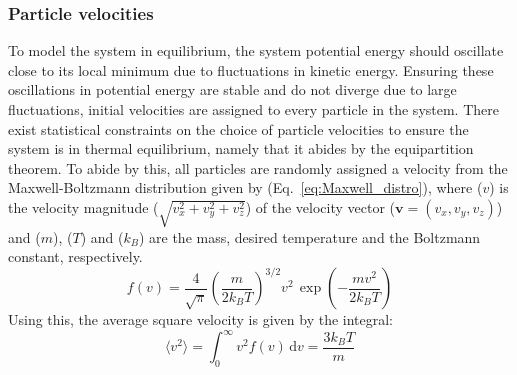 \subsubsection{Particle velocities}
To model the system in equilibrium, the system potential energy should oscillate close to its local minimum due to fluctuations in kinetic energy. Ensuring these oscillations in potential energy are stable and do not diverge due to large fluctuations, initial velocities are assigned to every particle in the system. There exist statistical constraints on the choice of particle velocities to ensure the system is in thermal equilibrium, namely that it abides by the equipartition theorem. To abide by this, all particles are randomly assigned a velocity from the Maxwell-Boltzmann distribution given by (Eq.~\ref{eq:Maxwell_distro}), where ($v$) is the velocity magnitude ($\sqrt{v_x^2 + v_y^2 + v_z^2}$) of the velocity vector ($\mathbf{v} = (v_x, v_y, v_z)$) and ($m$), ($T$) and ($k_B$) are the mass, desired temperature and the Boltzmann constant, respectively. 
%
\begin{equation} \label{eq:Maxwell_distro}
    f(v) = \frac{4}{\sqrt{\pi}} \left( \frac{m}{2k_B T} \right)^{3/2} v^2 \, \exp{\left( - \frac{mv^2}{2k_B T}\right)}
\end{equation}
%
Using this, the average square velocity is given by the integral:
\begin{equation}
    \langle v^2 \rangle = \int_0^{\infty} v^2 f(v)\,\mathrm{d}v = \frac{3k_B T}{m}
\end{equation}
%

